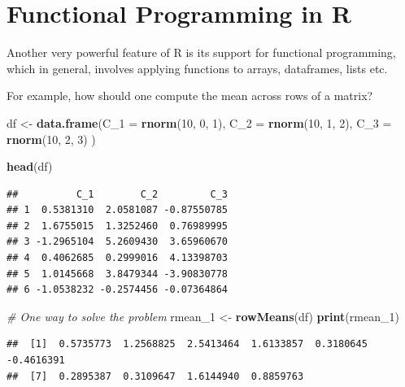 \documentclass[12pt,]{article}
\newenvironment{Shaded}{\begin{snugshade}}{\end{snugshade}}
\newcommand{\KeywordTok}[1]{\textcolor[rgb]{0.13,0.29,0.53}{\textbf{#1}}}
\newcommand{\DataTypeTok}[1]{\textcolor[rgb]{0.13,0.29,0.53}{#1}}
\newcommand{\DecValTok}[1]{\textcolor[rgb]{0.00,0.00,0.81}{#1}}
\newcommand{\StringTok}[1]{\textcolor[rgb]{0.31,0.60,0.02}{#1}}
\newcommand{\CommentTok}[1]{\textcolor[rgb]{0.56,0.35,0.01}{\textit{#1}}}
\newcommand{\NormalTok}[1]{#1}
\begin{document}
\section{Functional Programming in R}\label{functional-programming-in-r}

Another very powerful feature of R is its support for functional
programming, which in general, involves applying functions to arrays,
dataframes, lists etc.

For example, how should one compute the mean across rows of a matrix?

\begin{Shaded}
\begin{Highlighting}[]
\NormalTok{df <-}\StringTok{ }\KeywordTok{data.frame}\NormalTok{(}\DataTypeTok{C_1 =} \KeywordTok{rnorm}\NormalTok{(}\DecValTok{10}\NormalTok{, }\DecValTok{0}\NormalTok{, }\DecValTok{1}\NormalTok{), }
                 \DataTypeTok{C_2 =} \KeywordTok{rnorm}\NormalTok{(}\DecValTok{10}\NormalTok{, }\DecValTok{1}\NormalTok{, }\DecValTok{2}\NormalTok{),}
                 \DataTypeTok{C_3 =} \KeywordTok{rnorm}\NormalTok{(}\DecValTok{10}\NormalTok{, }\DecValTok{2}\NormalTok{, }\DecValTok{3}\NormalTok{)}
\NormalTok{                 )}

\KeywordTok{head}\NormalTok{(df)}
\end{Highlighting}
\end{Shaded}

\begin{verbatim}
##          C_1        C_2         C_3
## 1  0.5381310  2.0581087 -0.87550785
## 2  1.6755015  1.3252460  0.76989995
## 3 -1.2965104  5.2609430  3.65960670
## 4  0.4062685  0.2999016  4.13398703
## 5  1.0145668  3.8479344 -3.90830778
## 6 -1.0538232 -0.2574456 -0.07364864
\end{verbatim}

\begin{Shaded}
\begin{Highlighting}[]
\CommentTok{# One way to solve the problem}
\NormalTok{rmean_}\DecValTok{1}\NormalTok{ <-}\StringTok{ }\KeywordTok{rowMeans}\NormalTok{(df)}
\KeywordTok{print}\NormalTok{(rmean_}\DecValTok{1}\NormalTok{)}
\end{Highlighting}
\end{Shaded}

\begin{verbatim}
##  [1]  0.5735773  1.2568825  2.5413464  1.6133857  0.3180645 -0.4616391
##  [7]  0.2895387  0.3109647  1.6144940  0.8859763
\end{verbatim}
\end{document}
